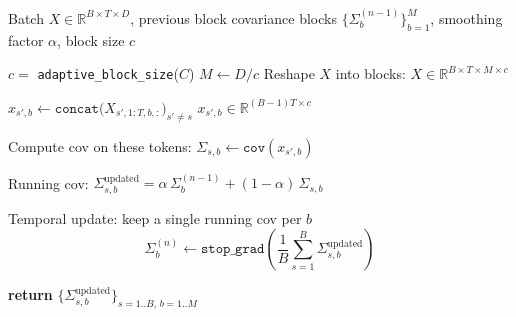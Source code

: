 \begin{algorithm}[tb]
\caption{CBW Sequence-Block Covariance}
\label{alg:cbw_cov_blocks}
\begin{algorithmic}
\REQUIRE Batch $X \in \mathbb{R}^{B \times T \times D}$,
         previous block covariance blocks $\{\Sigma_b^{(n-1)}\}_{b=1}^M$,
         smoothing factor $\alpha$, block size $c$

\STATE $c=$ \texttt{adaptive\_block\_size}($C$)
\STATE $M \gets D / c$
\STATE Reshape $X$ into blocks:
       $X \in \mathbb{R}^{B \times T \times M \times c}$


    \STATE {}
    \STATE $x_{s',b} \gets \texttt{concat}\bigl(X_{s',1:T,b,:}\bigr)_{s' \neq s}$
    \STATE $x_{s',b} \in \mathbb{R}^{(B-1)T \times c}$

    \STATE Compute cov on these tokens:
    $
        \Sigma_{s,b} \gets \texttt{cov}(x_{s',b})
    $

    \STATE Running cov:
    $
        \Sigma_{s,b}^{\text{updated}}
        =
        \alpha\,\Sigma_b^{(n-1)}
        +
        (1-\alpha)\,\Sigma_{s,b}
    $

\ENDFOR

\STATE Temporal update: keep a single running cov per $b$
\[
    \Sigma_b^{(n)} \gets \texttt{stop\_grad}\!\left( \frac{1}{B} 
    \sum_{s=1}^B \Sigma_{s,b}^{\text{updated}} \right)
\]
\ENDFOR

\STATE \textbf{return}
       $\{\Sigma_{s,b}^{\text{updated}}\}_{s=1..B,\,b=1..M}$

\end{algorithmic}
\end{algorithm}

